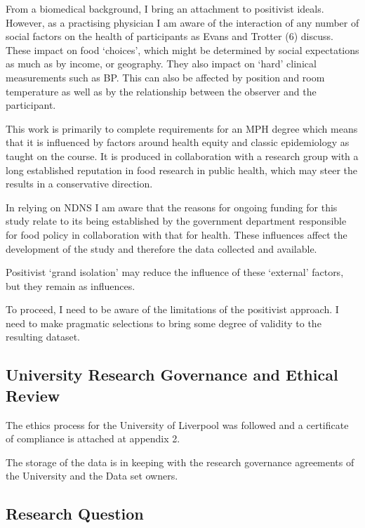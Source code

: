 \documentclass[
]{article}
\begin{document}
From a biomedical background, I bring an attachment to positivist
ideals. However, as a practising physician I am aware of the interaction
of any number of social factors on the health of participants as Evans
and Trotter (6) discuss. These impact on food `choices', which might be
determined by social expectations as much as by income, or geography.
They also impact on `hard' clinical measurements such as BP. This can
also be affected by position and room temperature as well as by the
relationship between the observer and the participant.

This work is primarily to complete requirements for an MPH degree which
means that it is influenced by factors around health equity and classic
epidemiology as taught on the course. It is produced in collaboration
with a research group with a long established reputation in food
research in public health, which may steer the results in a conservative
direction.

In relying on NDNS I am aware that the reasons for ongoing funding for
this study relate to its being established by the government department
responsible for food policy in collaboration with that for health. These
influences affect the development of the study and therefore the data
collected and available.

Positivist `grand isolation' may reduce the influence of these
`external' factors, but they remain as influences.

To proceed, I need to be aware of the limitations of the positivist
approach. I need to make pragmatic selections to bring some degree of
validity to the resulting dataset.

\hypertarget{university-research-governance-and-ethical-review}{%
\subsection{University Research Governance and Ethical
Review}\label{university-research-governance-and-ethical-review}}

The ethics process for the University of Liverpool was followed and a
certificate of compliance is attached at appendix 2.

The storage of the data is in keeping with the research governance
agreements of the University and the Data set owners.

\hypertarget{research-question}{%
\subsection{Research Question}\label{research-question}}
\end{document}
